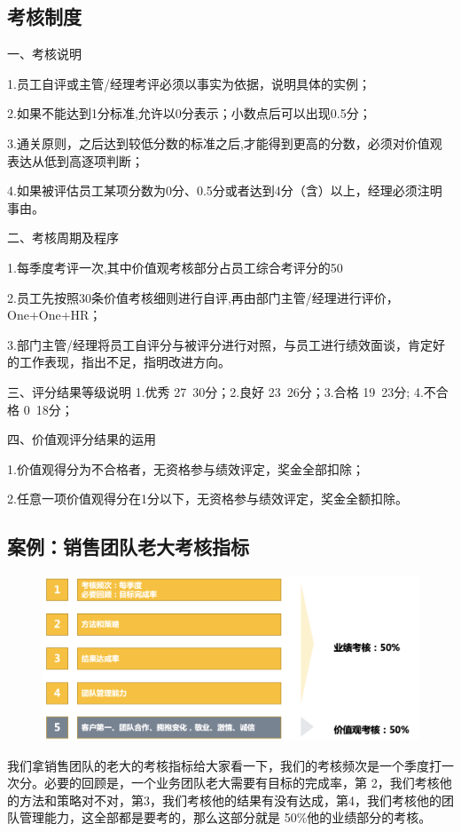 \documentclass[12pt]{article}
\begin{document}
\subsection{考核制度}
一、考核说明

1.员工自评或主管/经理考评必须以事实为依据，说明具体的实例；

2.如果不能达到1分标准,允许以0分表示；小数点后可以出现0.5分；

3.通关原则，之后达到较低分数的标准之后,才能得到更高的分数，必须对价值观表达从低到高逐项判断；

4.如果被评估员工某项分数为0分、0.5分或者达到4分（含）以上，经理必须注明事由。

二、考核周期及程序

1.每季度考评一次,其中价值观考核部分占员工综合考评分的50%

2.员工先按照30条价值考核细则进行自评,再由部门主管/经理进行评价，One+One+HR；

3.部门主管/经理将员工自评分与被评分进行对照，与员工进行绩效面谈，肯定好的工作表现，指出不足，指明改进方向。

三、评分结果等级说明 1.优秀 27~30分；2.良好 23~26分；3.合格 19~23分; 4.不合格 0~18分；

四、价值观评分结果的运用

1.价值观得分为不合格者，无资格参与绩效评定，奖金全部扣除；

2.任意一项价值观得分在1分以下，无资格参与绩效评定，奖金全额扣除。

\subsection{案例：销售团队老大考核指标}
\begin{figure}[H]
    \centering
    \includegraphics[width=1\textwidth]{fig/Ali_Performance_8.png}
\end{figure}

我们拿销售团队的老大的考核指标给大家看一下，我们的考核频次是一个季度打一次分。必要的回顾是，一个业务团队老大需要有目标的完成率，第 2，我们考核他的方法和策略对不对，第3，我们考核他的结果有没有达成，第4，我们考核他的团队管理能力，这全部都是要考的，那么这部分就是 50\%他的业绩部分的考核。
\end{document}
